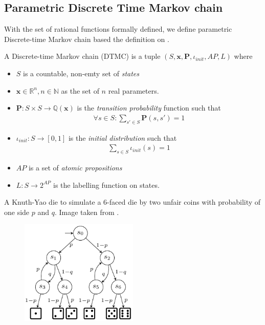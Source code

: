 \subsection{Parametric Discrete Time Markov chain}
With the set of rational functions formally defined, we define parametric Discrete-time Markov chain
based the definition on \cite{junges2019parameter}.
\begin{definition}
    A Discrete-time Markov chain (DTMC) is a tuple $(S, \mathbf{x}, \mathbf{P}, \iota_{init}, AP, L)$
    where
    \begin{itemize}
        \item $S$ is a countable, non-emty set of \textit{states}
        \item $\mathbf{x} \in \mathbb{R}^n, n \in \mathbb{N}$ as the set of $n$ real parameters.
        \item $\mathbf{P}:S\times S \rightarrow \mathbb{Q}(\mathbf{x})$ is the \textit{transition
                  probability} function such that
              \begin{align*}
                  \forall s \in S : \sum_{s'\in S}\mathbf{P}(s, s') = 1
              \end{align*}
        \item $\iota_{init}: S \rightarrow [0,1]$ is the \textit{initial distribution} such that
              \begin{align*}
                  \sum_{s\in S}\iota_{init}(s) = 1
              \end{align*}
        \item $AP$ is a set of \textit{atomic propositions}
        \item $L: S \rightarrow 2^{AP}$ is the labelling function on states.
    \end{itemize}
\end{definition}

\begin{example}
    A Knuth-Yao die to simulate a 6-faced die by two unfair coins with probability of one
    side $p$ and $q$. Image taken from \cite{katoen2016probabilistic}.
    \begin{figure}[H]
        \centering
        \includegraphics[width=0.5\textwidth]{figures/knuth_die_pq.png}
        \label{fig:knuth-die-pq}
    \end{figure}
\end{example}

